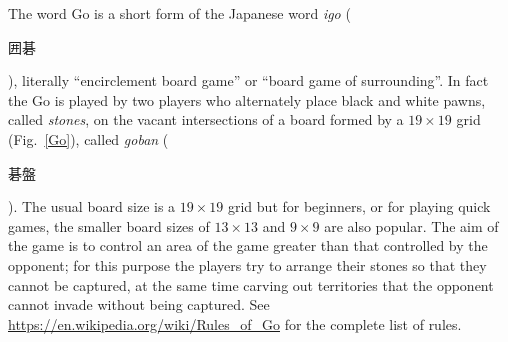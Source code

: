 The word Go is a short form of the Japanese word \emph{igo} (\begin{CJK}{UTF8}{min}囲碁\end{CJK}), literally ``encirclement board game'' or ``board game of surrounding''. In fact the Go is played by two players who alternately place black and white pawns, called \emph{stones}, on the vacant intersections of a board formed by a $19\times19$ grid (Fig.~\ref{Go}), called \emph{goban} (\begin{CJK}{UTF8}{min}碁盤\end{CJK}). The usual board size is a $19\times19$ grid but for beginners, or for playing quick games, the smaller board sizes of $13\times13$ and $9\times9$ are also popular. The aim of the game is to control an area of the game greater than that controlled by the opponent; for this purpose the players try to arrange their stones so that they cannot be captured, at the same time carving out territories that the opponent cannot invade without being captured. See \url{https://en.wikipedia.org/wiki/Rules_of_Go} for the complete list of rules.

